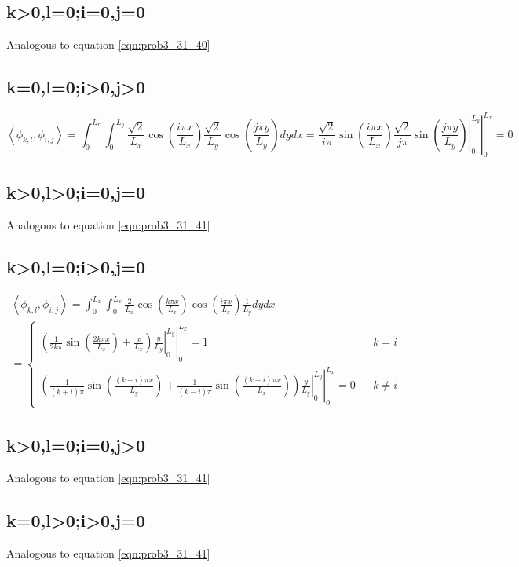 \documentclass[12pt]{article}
\begin{document}
\subsection*{k>0,l=0;i=0,j=0}
Analogous to equation \eqref{eqn:prob3_31_40}
\subsection*{k=0,l=0;i>0,j>0}
\begin{equation}
\left<\phi_{k,l},\phi_{i,j}\right>=\int_{0}^{L_x} \int_{0}^{L_y} \frac{\sqrt{2}}{L_x}\cos(\frac{i \pi x}{L_x})\frac{\sqrt{2}}{L_y}\cos(\frac{j \pi y}{L_y})dydx=\left.\left.\frac{\sqrt{2}}{i \pi}\sin(\frac{i \pi x}{L_x})\frac{\sqrt{2}}{j \pi}\sin(\frac{j \pi y}{L_y})\right|_{0}^{L_y} \right|_{0}^{L_x}=0
\label{eqn:prob3_31_41}
\end{equation}
\subsection*{k>0,l>0;i=0,j=0}
Analogous to equation \eqref{eqn:prob3_31_41}
\subsection*{k>0,l=0;i>0,j=0}
\begin{multline}
\left<\phi_{k,l},\phi_{i,j}\right>=\int_{0}^{L_x} \int_{0}^{L_x} \frac{2}{L_x}\cos(\frac{k \pi x}{L_x})\cos(\frac{i \pi x}{L_x})\frac{1}{L_y}dydx\\
=\left\{\begin{array}{rcl}
\left.\left.\left(\frac{1}{2k \pi}\sin(\frac{2k  \pi x}{L_x})+ \frac{x}{L_x} \right)\frac{y}{L_y}\right|_{0}^{L_y} \right|_{0}^{L_x}=1 & & {k=i}\\
\left.\left.\left(\frac{1}{(k+i) \pi}\sin(\frac{(k+i) \pi x}{L_y})+\frac{1}{(k-i) \pi}\sin(\frac{(k-i) \pi x}{L_x})\right)\frac{y}{L_y}\right|_{0}^{L_y} \right|_{0}^{L_x} =0 & & {k \neq i}
\end{array}\right.
\label{eqn:prob3_32_40}
\end{multline}
\subsection*{k>0,l=0;i=0,j>0}
Analogous to equation \eqref{eqn:prob3_31_41}
\subsection*{k=0,l>0;i>0,j=0}
Analogous to equation \eqref{eqn:prob3_31_41}
\end{document}
